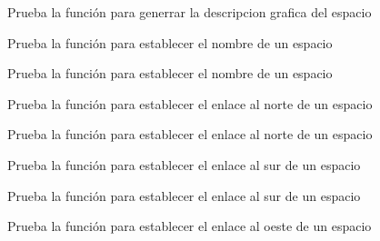 \begin{DoxyRefList}
Prueba la función para generrar la descripcion grafica del espacio  
\item[\label{test__test000028}%
\Hypertarget{test__test000028}%
Member \hyperlink{space__test_8c_a2569bab6cfeec15f722d232bb8c78c9e}{test1\+\_\+space\+\_\+set\+\_\+name} ()]Prueba la función para establecer el nombre de un espacio 

Prueba la función para establecer el nombre de un espacio  
\item[\label{test__test000031}%
\Hypertarget{test__test000031}%
Member \hyperlink{space__test_8c_a3d3457a89f705948102cf1e5d4a7b45b}{test1\+\_\+space\+\_\+set\+\_\+north} ()]Prueba la función para establecer el enlace al norte de un espacio 

Prueba la función para establecer el enlace al norte de un espacio  
\item[\label{test__test000034}%
\Hypertarget{test__test000034}%
Member \hyperlink{space__test_8c_a21938e16547b3080e9251f960117a859}{test1\+\_\+space\+\_\+set\+\_\+south} ()]Prueba la función para establecer el enlace al sur de un espacio 

Prueba la función para establecer el enlace al sur de un espacio  
\item[\label{test__test000040}%
\Hypertarget{test__test000040}%
Member \hyperlink{space__test_8c_ab680a8797f793dffd58546074b87d21f}{test1\+\_\+space\+\_\+set\+\_\+west} ()]Prueba la función para establecer el enlace al oeste de un espacio 


\end{DoxyRefList}
